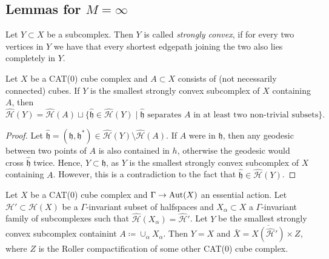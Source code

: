 \subsection{Lemmas for \(M = \infty\)}
\label{sec:M=infty}

\begin{defin}
  Let \(Y \subset X\) be a subcomplex. Then \(Y\) is called \emph{strongly convex}, if for every two vertices in \(Y\) we have that every shortest edgepath joining the two also lies completely in \(Y\).
\end{defin}

\begin{lemma}[{\cite[Lemma~4.16]{MR3509968}}]
  \label{lem:4.16}
  Let \(X\) be a CAT(0) cube complex and \(A \subset X\) consists of (not necessarily connected) cubes. If \(Y\) is the smallest strongly convex subcomplex of \(X\) containing \(A\), then
  \[
    \mathcal{\hat H}(Y) = \mathcal{\hat H}(A) \sqcup \{\mathfrak{\hat h} \in \mathcal{\hat H}(Y) \mid \mathfrak{\hat h} \text{ separates } A \text{ in at least two non-trivial subsets}\}.
  \]
\end{lemma}

\begin{proof}
  Let \(\mathfrak{\hat h} = (\mathfrak{h}, \mathfrak{h}^\ast) \in \mathcal{\hat H}(Y) \setminus \mathcal{\hat H}(A)\). If \(A\) were in \(\mathfrak{h}\), then any geodesic between two points of \(A\) is also contained in \(h\), otherwise the geodesic would cross \(\mathfrak{\hat h}\) twice. Hence, \(Y \subset \mathfrak{h}\), as \(Y\) is the smallest strongly convex subcomplex of \(X\) containing \(A\). However, this is a contradiction to the fact that \(\mathfrak{\hat h} \in \mathcal{\hat H}(Y)\).
\end{proof}

\begin{prop}[{\cite[Proposition~4.17]{MR3509968}}]
  \label{prop:4.17}
  Let \(X\) be a CAT(0) cube complex and \(\Gamma \to \operatorname{Aut}(X)\) an essential action. Let \(\mathcal{H}' \subset \mathcal{H}(X)\) be a \(\Gamma\)-invariant subset of halfspaces and \(X_\alpha \subset X\) a \(\Gamma\)-invariant family of subcomplexes such that \(\mathcal{\hat H}(X_\alpha) = \mathcal{\hat H}'\). Let \(Y\) be the smallest strongly convex subcomplex containint \(A \coloneqq \cup_\alpha X_\alpha\). Then \(Y = X\) and \(\bar X = \overline{X(\mathcal{\hat H}')} \times Z\), where \(Z\) is the Roller compactification of some other CAT(0) cube complex.
\end{prop}

